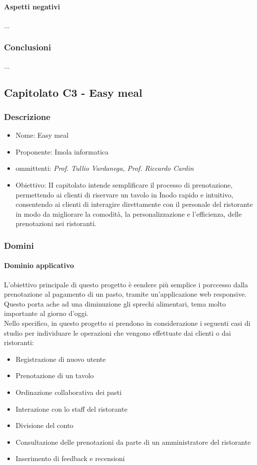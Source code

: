 \documentclass[italian,12pt]{article} %
\begin{document}
\paragraph{Aspetti negativi}
...

\subsubsection{Conclusioni}
...



\subsection{Capitolato C3 - Easy meal}

\subsubsection{Descrizione}
\begin{itemize}
	\item Nome: Easy meal
	\item Proponente: Imola informatica
	\item ommittenti: {\it Prof. Tullio Vardanega, Prof. Riccardo Cardin}
	\item Obiettivo: II capitolato intende semplificare il processo di prenotazione, permettendo ai clienti di riservare un tavolo in Inodo rapido e intuitivo, consentendo ai clienti di interagire direttamente con il personale del ristorante in modo da migliorare la comodità, la personalizzazione e l'efficienza, delle prenotazioni nei ristoranti.
\end{itemize}

\subsubsection{Domini}
\paragraph{Dominio applicativo}
L'obiettivo principale di questo progetto è eendere più semplice i porccesso dalla prenotazione al pagamento di un pasto, tramite un'applicazione web responsive. Questo porta ache ad una diminuzione gli sprechi alimentari, tema molto importante al giorno d'oggi. \\
Nello specifico, in questo progetto si prendono in considerazione i seguenti casi di studio per individuare le operazioni che vengono effettuate dai clienti o dai ristoranti:
\begin{itemize}
	\item Registrazione di nuovo utente
	\item Prenotazione di un tavolo
	\item Ordinazione collaborativa dei pasti
	\item Interazione con lo staff del ristorante
	\item Divisione del conto
	\item Consultazione delle prenotazioni da parte di un amministratore del ristorante
	\item Inserimento di feedback e recensioni
\end{itemize}
\end{document}
